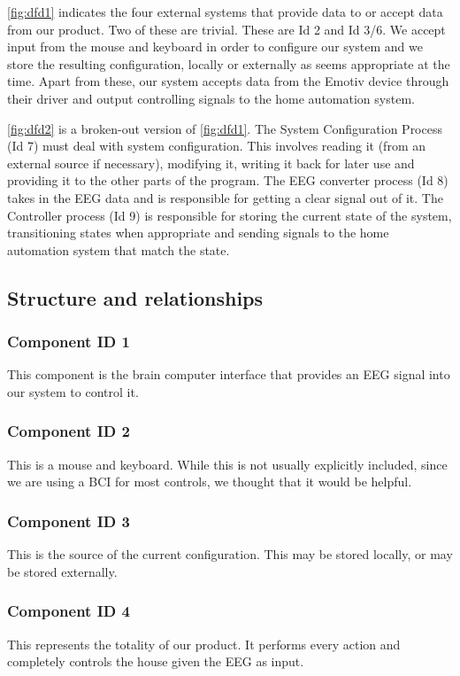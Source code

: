 \documentclass{article}
\begin{document}
\autoref{fig:dfd1} indicates the four external systems that
provide data to or accept data from our product. Two of these are trivial.
These are Id 2 and Id 3/6. We accept input from the mouse and keyboard in
order to configure our system and we store the resulting configuration,
locally or externally as seems appropriate at the time. Apart from these, our
system accepts data from the Emotiv device through their driver and output
controlling signals to the home automation system.

\autoref{fig:dfd2} is a broken-out version of \autoref{fig:dfd1}. The System
Configuration Process (Id 7) must deal with system configuration. This
involves reading it (from an external source if necessary), modifying it,
writing it back for later use and providing it to the other parts of the
program. The EEG converter process (Id 8) takes in the EEG data and is
responsible for getting a clear signal out of it. The Controller process (Id
9) is responsible for storing the current state of the system, transitioning
states when appropriate and sending signals to the home automation system that
match the state.

\subsection{Structure and relationships}

\subsubsection{Component ID 1}
This component is the brain computer interface that provides an EEG signal into our system to control it.

\subsubsection{Component ID 2}
This is a mouse and keyboard. While this is not usually explicitly included, since we are using a BCI for most controls, we thought that it would be helpful.

\subsubsection{Component ID 3}
This is the source of the current configuration. This may be stored locally, or may be stored externally.

\subsubsection{Component ID 4}
This represents the totality of our product. It performs every action and completely controls the house given the EEG as input.
\end{document}
